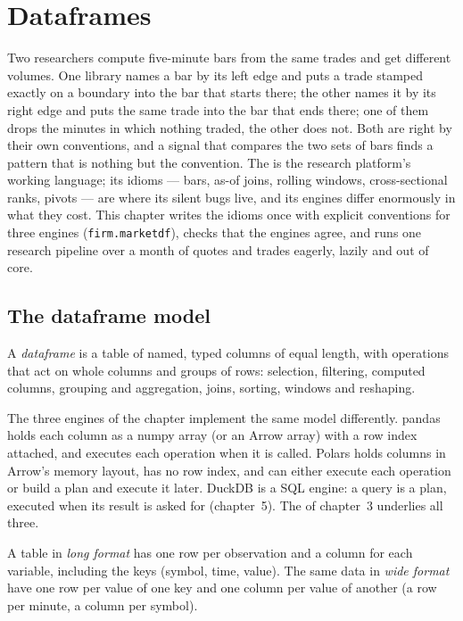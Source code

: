 \chapter{Dataframes}\label{ch:pl:dataframes}

Two researchers compute five-minute bars from the same trades and get different volumes. One library names a bar by its left
edge and puts a trade stamped exactly on a boundary into the bar that starts there; the other names it by its right edge and
puts the same trade into the bar that ends there; one of them drops the minutes in which nothing traded, the other does not.
Both are right by their own conventions, and a signal that compares the two sets of bars finds a pattern that is nothing but the
convention. The  is the research platform's working language; its idioms --- bars, as-of joins, rolling windows,
cross-sectional ranks, pivots --- are where its silent bugs live, and its engines differ enormously in what they cost. This chapter
writes the idioms once with explicit conventions for three engines (\texttt{firm.marketdf}), checks that the engines agree, and
runs one research pipeline over a month of quotes and trades eagerly, lazily and out of core.

\section{The dataframe model}

\begin{definition}[Dataframe]\label{def:pl:dataframes:dataframe}
A \emph{dataframe} is a table of named, typed columns of equal length, with operations that act on whole columns
and groups of rows: selection, filtering, computed columns, grouping and aggregation, joins, sorting, windows and reshaping.
\end{definition}

The three engines of the chapter implement the same model differently. pandas holds each column as a numpy array (or an Arrow
array) with a row index attached, and executes each operation when it is called. Polars holds columns in Arrow's memory layout,
has no row index, and can either execute each operation or build a plan and execute it later. DuckDB is a SQL engine: a query
is a plan, executed when its result is asked for (chapter~5). The  of chapter~3 underlies all three.

\begin{definition}\label{def:pl:dataframes:shape}
A table in \emph{long format} has one row per observation and a column for each variable, including the keys
(symbol, time, value). The same data in \emph{wide format} have one row per value of one key and one column per
value of another (a row per minute, a column per symbol).
\end{definition}

